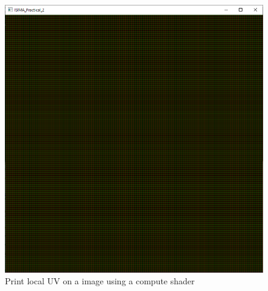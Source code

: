 \documentclass{article}
\begin{document}
\begin{figure}[h]
	\centering
	\includegraphics[scale=0.35]{images/local_uv.png}
	\caption{Print local UV on a image using a compute shader}
\end{figure}
\end{document}
